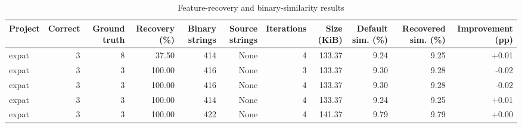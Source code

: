 \begin{table}[htbp]
\centering
\caption{Feature-recovery and binary-similarity results}
\label{tab:feature-recovery-results}
\small
\begin{tabular}{lrrrrrrrrrr}
\toprule
Project & Correct & Ground truth & Recovery (\%) & Binary strings & Source strings & Iterations & Size (KiB) & Default sim. (\%) & Recovered sim. (\%) & Improvement (pp) \\
\midrule
expat & 3 & 8 & 37.50 & 414 & None & 4 & 133.37 & 9.24 & 9.25 & +0.01 \\
expat & 3 & 3 & 100.00 & 416 & None & 3 & 133.37 & 9.30 & 9.28 & -0.02 \\
expat & 3 & 3 & 100.00 & 416 & None & 4 & 133.37 & 9.30 & 9.28 & -0.02 \\
expat & 3 & 3 & 100.00 & 414 & None & 4 & 133.37 & 9.24 & 9.25 & +0.01 \\
expat & 3 & 3 & 100.00 & 422 & None & 4 & 141.37 & 9.79 & 9.79 & +0.00 \\
\bottomrule
\end{tabular}
\end{table}
